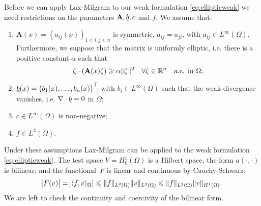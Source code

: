 \documentclass[thesis.tex]{subfiles}
\begin{document}
Before we can apply  Lax-Milgram to our weak formulation \eqref{eq:ellipticweak} we need restrictions on the parameters $\mathbf{A}, \underline{b}, c$ and $f$. We assume that:
\begin{enumerate}[label=(\alph*)]
  \item $\mathbf{A}(x) = (a_{ij}(x))_{1 \leq i,j \leq n}$ is symmetric, $a_{ij} = a_{ji}$, with $a_{ij} \in L^{\infty}(\Omega)$. Furthermore, we suppose that the matrix is uniformly elliptic, i.e. there is a positive constant $\alpha$ such that 
\[
  \zeta \cdot (\mathbf{A}(x) \zeta) \geqslant \alpha \|\zeta\|^2 \quad \forall \zeta \in \mathbb{R}^n \quad \text{a.e. in } \Omega;
\]
\item $\underline{b}(x) = \left(b_1(x), \dots, b_n(x)\right)^\top$ with $b_i \in L^\infty(\Omega)$ such that the weak divergence vanishes, i.e. $\nabla \cdot \underline{b} = 0$ in $\Omega$;
\item $c \in L^\infty(\Omega)$ is non-negative;
\item $f  \in L^2(\Omega)$.
\end{enumerate}
Under these assumptions Lax-Milgram can be applied to the weak formulation \eqref{eq:ellipticweak}. The test space $V = H_0^1(\Omega)$ is
a Hilbert space, the form $a(\cdot, \cdot)$ is bilinear, and the functional~$F$ is linear and continuous by Cauchy-Schwarz:
\[
\abs{F(v)} = \abs{\langle f,v \rangle_\Omega} \leqslant \|f\|_{L^2(\Omega)} \|v\|_{L^2(\Omega)} \leqslant \|f\|_{L^2(\Omega)} \|v\|_{H^1(\Omega)}.
\]
We are left to check the continuity and coercivity of the bilinear form.
\end{document}
